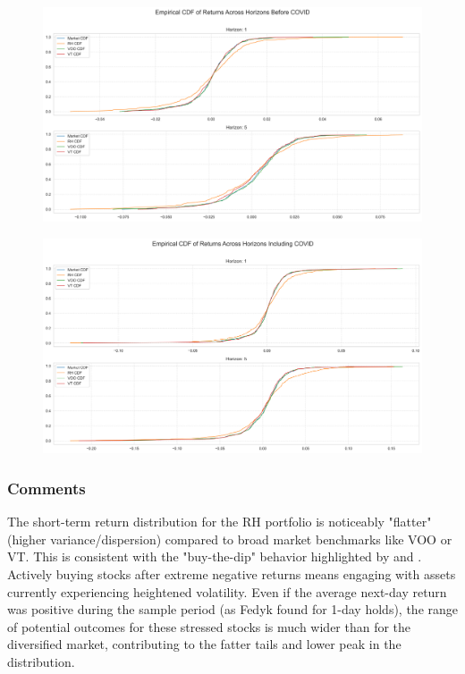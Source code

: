 \begin{figure}[H]
    \centering
    \includegraphics[width=1\linewidth]{Images/cdfs_before_1_5.png}
\end{figure}
\begin{figure}[H]
    \centering
    \includegraphics[width=1\linewidth]{Images/cdfs_including_1_5.png}
\end{figure}

\subsubsection{Comments}

The short-term return distribution for the RH portfolio is noticeably "flatter" (higher variance/dispersion) compared to broad market benchmarks like VOO or VT. 
This is consistent with the "buy-the-dip" behavior highlighted by \cite{Fedyk2024} and \cite{Ardia2023Fast}. 
Actively buying stocks after extreme negative returns means engaging with assets currently experiencing heightened volatility. Even if the average next-day return was positive during the sample period (as Fedyk found for 1-day holds), 
the range of potential outcomes for these stressed stocks is much wider than for the diversified market, contributing to the fatter tails and lower peak in the distribution.


